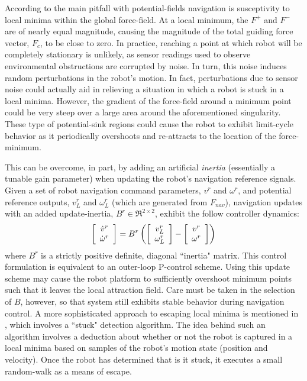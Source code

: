 		According to \cite{Koren1991} the main pitfall with potential-fields navigation is susceptivity to local minima within the global force-field. At a local minimum, the $F^{+}$ and $F^{-}$ are of nearly equal magnitude, causing the magnitude of the total guiding force vector, $F_{c}$, to be close to zero. In practice, reaching a point at which robot will be completely stationary is unlikely, as sensor readings used to observe environmental obstructions are corrupted by noise. In turn, this noise induces random perturbations in the robot's motion. In fact, perturbations due to sensor noise could actually aid in relieving a situation in which a robot is stuck in a local minima. However, the gradient of the force-field around a minimum point could be very steep over a large area around the aforementioned singularity. These type of potential-sink regions could cause the robot to exhibit limit-cycle behavior as it periodically overshoots and re-attracts to the location of the force-minimum. 

		This can be overcome, in part, by adding an artificial \emph{inertia} (essentially a tunable gain parameter) when updating the robot's navigation reference signals. Given a set of robot navigation command parameters, $v^{r}$ and $\omega^{r}$, and potential reference outputs, $v^{r}_{L}$ and $\omega^{r}_{L}$ (which are generated from $F_{nav}$), navigation updates with an added update-inertia, $B^{r}\in\Re^{2\times2}$, exhibit the follow controller dynamics:
			\begin{equation}
				\left[
					\begin{array}{c}
						\dot{v}^{r} 		\\
						\dot{\omega}^{r}
					\end{array}
				\right] = 
				B^{r}
				\left(
					\left[
						\begin{array}{c}
							v^{r}_{L} 	\\
							\omega^{r}_{L}
						\end{array}
					\right]
					-
					\left[
						\begin{array}{c}
							v^{r} 	\\
							\omega^{r}
						\end{array}
					\right]
				\right)
			\end{equation}
		where $B^{r}$ is a strictly positive definite, diagonal ``inertia" matrix. This control formulation is equivalent to an outer-loop P-control scheme. Using this update scheme may cause the robot platform to sufficiently overshoot minimum points such that it leaves the local attraction field. Care must be taken in the selection of $B$, however, so that system still exhibits stable behavior during navigation control. A more sophisticated approach to escaping local minima is mentioned in \cite{Krishnamurthy2007}, which involves a ``stuck" detection algorithm. The idea behind such an algorithm involves a deduction about whether or not the robot is captured in a local minima based on samples of the robot’s motion state (\IE position and velocity). Once the robot has determined that is it stuck, it executes a small random-walk as a means of escape. 

